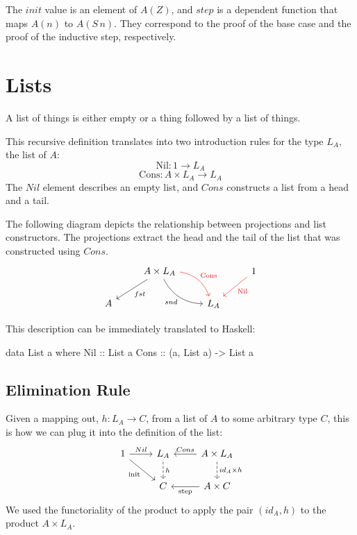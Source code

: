 \documentclass[DaoFP]{subfiles}
\begin{document}
The $init$ value is an element of $A(Z)$, and $step$ is a dependent function that maps $A(n)$ to $A(S\, n)$. They correspond to the proof of the base case and the proof of the inductive step, respectively.

\section{Lists}

A list of things is either empty or a thing followed by a list of things. 

This recursive definition translates into two introduction rules for the type $L_A$, the list of $A$: 
\[ \text{Nil} \colon 1 \to L_A \]
\[ \text{Cons} \colon A \times L_A \to L_A \]
The $Nil$ element describes an empty list, and $Cons$ constructs a list from a head and a tail. 

The following diagram depicts the relationship between projections and list constructors. The projections extract the head and the tail of the list that was constructed using $Cons$.
\[
 \begin{tikzcd}
 & A \times L_A
 \arrow[ld, "fst"]
 \arrow[rd, bend right, "snd"']
 \arrow[rd, bend left, red, "\text{Cons}"]
 && 1
 \arrow[ld, red, "\text{Nil}"]
 \\
 A
&&L_A
  \end{tikzcd}
\]

This description can be immediately translated to Haskell:
\begin{haskell}
data List a where
  Nil  :: List a
  Cons :: (a, List a) -> List a
\end{haskell}



\subsection{Elimination Rule}

Given a mapping out, $h \colon L_A \to C$, from a list of $A$ to some arbitrary type $C$, this is how we can plug it into the definition of the list:
\[
 \begin{tikzcd}
 1
 \arrow[r, "Nil"]
 \arrow[rd, "\text{init}"']
 &L_A
\arrow[d, dashed, "h"]
&A \times L_A
  \arrow[l, "Cons"']
\arrow[d, dashed, "id_A \times h"]
\\
& C
& A \times C
\arrow[l, "\text{step}"]
  \end{tikzcd}
\]
We used the functoriality of the product to apply the pair $(id_A, h)$ to the product $A \times L_A$.
\end{document}
